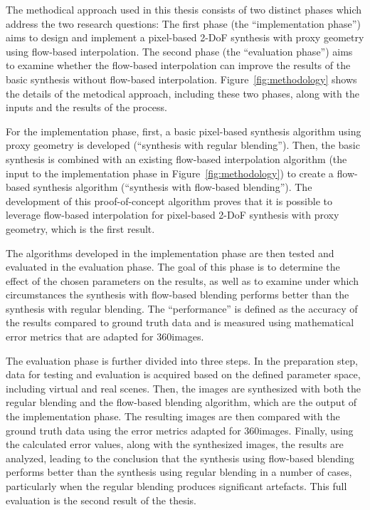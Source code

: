 The methodical approach used in this thesis consists of two distinct phases which address the two research questions: The first phase (the ``implementation phase'') aims to design and implement a pixel-based 2-DoF synthesis with proxy geometry using flow-based interpolation. The second phase (the ``evaluation phase'') aims to examine whether the flow-based interpolation can improve the results of the basic synthesis without flow-based interpolation. Figure~\ref{fig:methodology} shows the details of the metodical approach, including these two phases, along with the inputs and the results of the process.

For the implementation phase, first, a basic pixel-based synthesis algorithm using proxy geometry is developed (``synthesis with regular blending''). Then, the basic synthesis is combined with an existing flow-based interpolation algorithm (the input to the implementation phase in Figure~\ref{fig:methodology}) to create a flow-based synthesis algorithm (``synthesis with flow-based blending''). The development of this proof-of-concept algorithm proves that it is possible to leverage flow-based interpolation for pixel-based 2-DoF synthesis with proxy geometry, which is the first result.

The algorithms developed in the implementation phase are then tested and evaluated in the evaluation phase. The goal of this phase is to determine the effect of the chosen parameters on the results, as well as to examine under which circumstances the synthesis with flow-based blending performs better than the synthesis with regular blending. The ``performance'' is defined as the accuracy of the results compared to ground truth data and is measured using mathematical error metrics that are adapted for 360\degree images.

The evaluation phase is further divided into three steps. In the preparation step, data for testing and evaluation is acquired based on the defined parameter space, including virtual and real scenes. Then, the images are synthesized with both the regular blending and the flow-based blending algorithm, which are the output of the implementation phase. The resulting images are then compared with the ground truth data using the error metrics adapted for 360\degree images. 
Finally, using the calculated error values, along with the synthesized images, the results are analyzed, leading to the conclusion that the synthesis using flow-based blending performs better than the synthesis using regular blending in a number of cases, particularly when the regular blending produces significant artefacts. This full evaluation is the second result of the thesis.

